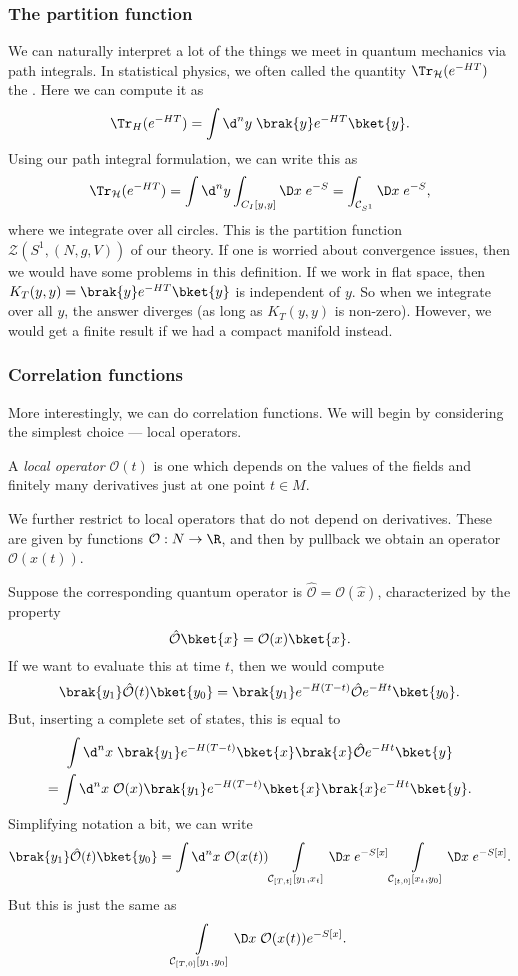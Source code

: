 \documentclass[a4paper]{article}
\begin{document}
\subsubsection*{The partition function}
We can naturally interpret a lot of the things we meet in quantum mechanics via path integrals. In statistical physics, we often called the quantity $\Tr_\mathcal{H} (e^{-HT})$ the . Here we can compute it as
\[
  \Tr_H(e^{-HT}) = \int \d^n y\; \brak{y}e^{-HT} \bket{y}.
\]
Using our path integral formulation, we can write this as
\[
  \Tr_\mathcal{H} (e^{-HT}) = \int \d^n y \int_{C_I[y, y]} \D x\; e^{-S} = \int_{\mathcal{C}_{S^1}} \D x\; e^{-S},
\]
where we integrate over all circles. This is the partition function $\mathcal{Z}(S^1, (N, g, V))$ of our theory. If one is worried about convergence issues, then we would have some problems in this definition. If we work in flat space, then $K_T(y, y) = \brak{y}e^{-HT}\bket{y}$ is independent of $y$. So when we integrate over all $y$, the answer diverges (as long as $K_T(y, y)$ is non-zero). However, we would get a finite result if we had a compact manifold instead.

\subsubsection*{Correlation functions}
More interestingly, we can do correlation functions. We will begin by considering the simplest choice --- local operators.
\begin{defi}
  A \emph{local operator} $\mathcal{O}(t)$ is one which depends on the values of the fields and finitely many derivatives just at one point $t \in M$.
\end{defi}
We further restrict to local operators that do not depend on derivatives. These are given by functions $\mathcal{O}: N \to \R$, and then by pullback we obtain an operator $\mathcal{O}(x(t))$.

Suppose the corresponding quantum operator is $\hat{\mathcal{O}} = \mathcal{O}(\hat{x})$, characterized by the property
\[
  \hat{\mathcal{O}}\bket{x} = \mathcal{O}(x) \bket{x}.
\]
If we want to evaluate this at time $t$, then we would compute
\[
  \brak{y_1} \hat{\mathcal{O}}(t) \bket{y_0} = \brak{y_1} e^{-H(T - t)} \hat{\mathcal{O}} e^{-Ht} \bket{y_0}.
\]
But, inserting a complete set of states, this is equal to
\begin{multline*}
  \int \d^n x\; \brak{y_1} e^{-H(T - t)}\bket{x} \brak{x}\hat{\mathcal{O}} e^{-Ht} \bket{y} \\
  = \int \d^n x\; \mathcal{O}(x) \brak{y_1} e^{-H(T - t)} \bket{x} \brak{x} e^{-Ht} \bket{y}.
\end{multline*}
Simplifying notation a bit, we can write
\[
  \brak{y_1} \hat{\mathcal{O}}(t) \bket{y_0} = \int \d^n x\; \mathcal{O}(x(t)) \int\limits_{\mathcal{C}_{[T, t]} [y_1, x_t]} \D x\; e^{-S[x]} \int\limits_{\mathcal{C}_{[t, 0]}[x_t, y_0]} \D x\; e^{-S[x]}.
\]
But this is just the same as
\[
  \int\limits_{\mathcal{C}_{[T, 0]}[y_1, y_0]} \D x\; \mathcal{O}(x(t)) e^{-S[x]}.
\]
\end{document}
